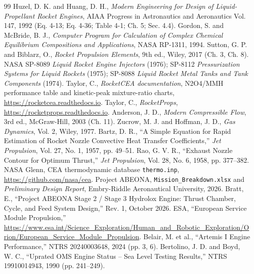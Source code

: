 \documentclass[10pt]{article}
\begin{document}
\begin{thebibliography}{99}\small
{} Huzel, D. K. and Huang, D. H., \emph{Modern Engineering for Design of Liquid-Propellant Rocket Engines}, AIAA Progress in Astronautics and Aeronautics Vol. 147, 1992 (Eq. 4-13; Eq. 4-36; Table 4-1; Ch. 5; Sec. 4.4).
 Gordon, S. and McBride, B. J., \emph{Computer Program for Calculation of Complex Chemical Equilibrium Compositions and Applications}, NASA RP-1311, 1994.
 Sutton, G. P. and Biblarz, O., \emph{Rocket Propulsion Elements}, 9th ed., Wiley, 2017 (Ch. 3, Ch. 8).
 NASA SP-8089 \emph{Liquid Rocket Engine Injectors} (1976); SP-8112 \emph{Pressurization Systems for Liquid Rockets} (1975); SP-8088 \emph{Liquid Rocket Metal Tanks and Tank Components} (1974).
 Taylor, C., \emph{RocketCEA documentation}, N2O4/MMH performance table and kinetic-peak mixture-ratio charts, \url{https://rocketcea.readthedocs.io}.
 Taylor, C., \emph{RocketProps}, \url{https://rocketprops.readthedocs.io}.
 Anderson, J. D., \emph{Modern Compressible Flow}, 3rd ed., McGraw-Hill, 2003 (Ch. 11).
 Zucrow, M. J. and Hoffman, J. D., \emph{Gas Dynamics}, Vol. 2, Wiley, 1977.
 Bartz, D. R., ``A Simple Equation for Rapid Estimation of Rocket Nozzle Convective Heat Transfer Coefficients,'' \emph{Jet Propulsion}, Vol. 27, No. 1, 1957, pp. 49--51.
 Rao, G. V. R., ``Exhaust Nozzle Contour for Optimum Thrust,'' \emph{Jet Propulsion}, Vol. 28, No. 6, 1958, pp. 377--382.
 NASA Glenn, CEA thermodynamic database \texttt{thermo.inp}, \url{https://github.com/nasa/cea}.
 Project ABEONA, \texttt{Mission\_Breakdown.xlsx} and \emph{Preliminary Design Report}, Embry-Riddle Aeronautical University, 2026.
 Bratt, E., ``Project ABEONA Stage 2 / Stage 3 Hydrolox Engine: Thrust Chamber, Cycle, and Feed System Design,'' Rev. 1, October 2026.
 ESA, ``European Service Module Propulsion,'' \url{https://www.esa.int/Science_Exploration/Human_and_Robotic_Exploration/Orion/European_Service_Module_Propulsion}.
 Belair, M. et al., ``Artemis I Engine Performance,'' NTRS 20240003648, 2024 (pp. 3, 6).
 Bertolino, J. D. and Boyd, W. C., ``Uprated OMS Engine Status -- Sea Level Testing Results,'' NTRS 19910014943, 1990 (pp. 241--249).
\end{thebibliography}
\end{document}
